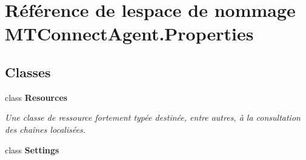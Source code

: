 \hypertarget{namespace_m_t_connect_agent_1_1_properties}{}\section{Référence de l\textquotesingle{}espace de nommage M\+T\+Connect\+Agent.\+Properties}
\label{namespace_m_t_connect_agent_1_1_properties}
\subsection*{Classes}
\begin{DoxyCompactItemize}
\item 
class {\bfseries Resources}
\begin{DoxyCompactList}\small\item\em Une classe de ressource fortement typée destinée, entre autres, à la consultation des chaînes localisées. \end{DoxyCompactList}\item 
class {\bfseries Settings}
\end{DoxyCompactItemize}
